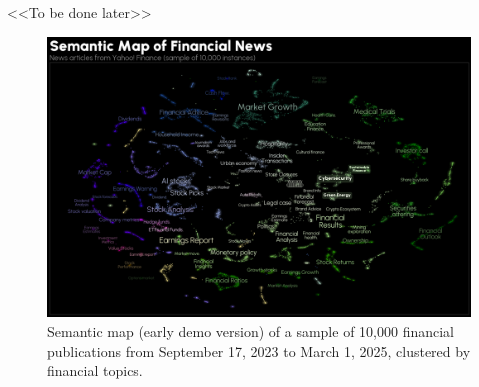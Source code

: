 <<To be done later>>

\begin{figure}[H]
    \centering
    \includegraphics[width=1\linewidth]{img/semantic_map.png}
    \caption{Semantic map (early demo version) of a sample of 10,000 financial publications
    from September 17, 2023 to March 1, 2025, clustered by financial topics.}
    \label{fig:semantic_map}
\end{figure}